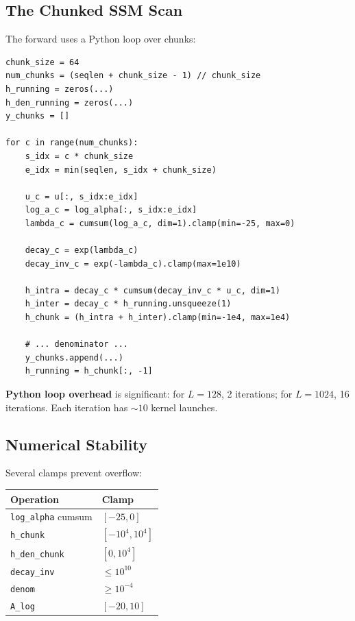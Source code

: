 \subsection{The Chunked SSM Scan}

The forward uses a Python loop over chunks:

\begin{lstlisting}
chunk_size = 64
num_chunks = (seqlen + chunk_size - 1) // chunk_size
h_running = zeros(...)
h_den_running = zeros(...)
y_chunks = []

for c in range(num_chunks):
    s_idx = c * chunk_size
    e_idx = min(seqlen, s_idx + chunk_size)
    
    u_c = u[:, s_idx:e_idx]
    log_a_c = log_alpha[:, s_idx:e_idx]
    lambda_c = cumsum(log_a_c, dim=1).clamp(min=-25, max=0)
    
    decay_c = exp(lambda_c)
    decay_inv_c = exp(-lambda_c).clamp(max=1e10)
    
    h_intra = decay_c * cumsum(decay_inv_c * u_c, dim=1)
    h_inter = decay_c * h_running.unsqueeze(1)
    h_chunk = (h_intra + h_inter).clamp(min=-1e4, max=1e4)
    
    # ... denominator ...
    y_chunks.append(...)
    h_running = h_chunk[:, -1]
\end{lstlisting}

\textbf{Python loop overhead} is significant: for $L = 128$, 2 iterations; for 
$L = 1024$, 16 iterations. Each iteration has $\sim 10$ kernel launches.

\subsection{Numerical Stability}

Several clamps prevent overflow:

\begin{table}[H]
\centering
\small
\begin{tabular}{ll}
\toprule
\textbf{Operation} & \textbf{Clamp} \\
\midrule
\texttt{log\_alpha} cumsum & $[-25, 0]$ \\
\texttt{h\_chunk} & $[-10^4, 10^4]$ \\
\texttt{h\_den\_chunk} & $[0, 10^4]$ \\
\texttt{decay\_inv} & $\leq 10^{10}$ \\
\texttt{denom} & $\geq 10^{-4}$ \\
\texttt{A\_log} & $[-20, 10]$ \\
\bottomrule
\end{tabular}
\end{table}


